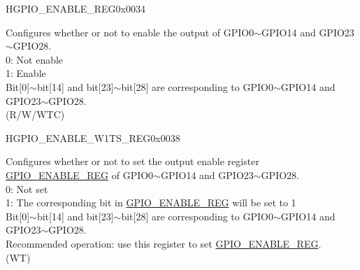 \begin{register}{H}{GPIO\_ENABLE\_REG}{0x0034}\label{regdesc:GPIOENABLEREG}
%
\regnewline%
\begin{regdesc}\begin{reglist}
\label{fielddesc:GPIOENABLEDATA}\item [GPIO\_ENABLE\_DATA] Configures whether or not to enable the output of GPIO0$\sim$GPIO14 and GPIO23$\sim$GPIO28.\\
0: Not enable\\
1: Enable\\ 
Bit[0]$\sim$bit[14] and bit[23]$\sim$bit[28] are corresponding to GPIO0$\sim$GPIO14 and GPIO23$\sim$GPIO28. \\(R/W/WTC)
\end{reglist}\end{regdesc}
\end{register}


\begin{register}{H}{GPIO\_ENABLE\_W1TS\_REG}{0x0038}\label{regdesc:GPIOENABLEW1TSREG}
%
\regnewline%
\begin{regdesc}\begin{reglist}
\label{fielddesc:GPIOENABLEW1TS}\item [GPIO\_ENABLE\_W1TS] Configures whether or not to set the output enable register \hyperref[regdesc:GPIOENABLEREG]{GPIO\_ENABLE\_REG} of GPIO0$\sim$GPIO14 and GPIO23$\sim$GPIO28.\\
0: Not set\\
1: The corresponding bit in \hyperref[regdesc:GPIOENABLEREG]{GPIO\_ENABLE\_REG} will be set to 1\\
Bit[0]$\sim$bit[14] and bit[23]$\sim$bit[28] are corresponding to GPIO0$\sim$GPIO14 and GPIO23$\sim$GPIO28.\\
Recommended operation: use this register to set \hyperref[regdesc:GPIOENABLEREG]{GPIO\_ENABLE\_REG}.\\ (WT)
\end{reglist}\end{regdesc}
\end{register}



